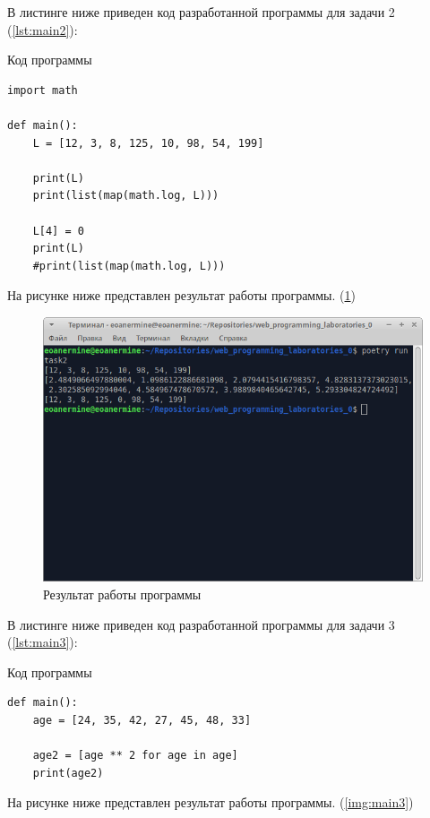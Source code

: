\documentclass[14pt]{extarticle}
\newenvironment{code}{\captionsetup{type=listing, belowskip=-14pt plus 3pt minus 0pt}}{}
\begin{document}
В листинге ниже приведен код разработанной программы для задачи 2 (\ref{lst:main2}):

\begin{code}    
\caption{Код программы\label{lst:main2}}
\begin{verbatim}
import math

def main():
	L = [12, 3, 8, 125, 10, 98, 54, 199]

	print(L)
	print(list(map(math.log, L)))

	L[4] = 0
	print(L)
	#print(list(map(math.log, L)))
\end{verbatim}
\end{code}

На рисунке ниже представлен результат работы программы. (\ref{img:main2})

\begin{figure}[H]
    \centering
    \includegraphics[width=1.0\linewidth]{main2.png}
    \caption{Результат работы программы\label{img:main2}}
\end{figure}

В листинге ниже приведен код разработанной программы для задачи 3 (\ref{lst:main3}):

\begin{code}    
\caption{Код программы\label{lst:main3}}
\begin{verbatim}
def main():
	age = [24, 35, 42, 27, 45, 48, 33]

	age2 = [age ** 2 for age in age]
	print(age2)
\end{verbatim}
\end{code}

На рисунке ниже представлен результат работы программы. (\ref{img:main3})
\end{document}
